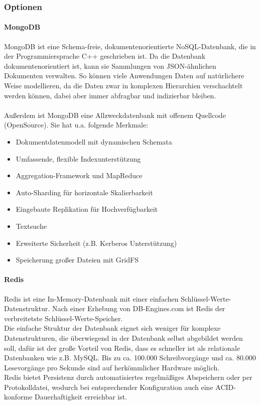 \documentclass[11pt]{article}
\begin{document}
\subsubsection{Optionen}

\paragraph{MongoDB}
MongoDB ist eine Schema-freie, dokumentenorientierte NoSQL-Datenbank, die in der Programmiersprache C++ geschrieben ist. Da die Datenbank dokumentenorientiert ist, kann sie Sammlungen von JSON-\"ahnlichen Dokumenten verwalten. So k\"onnen viele Anwendungen Daten auf nat\"urlichere Weise modellieren, da die Daten zwar in komplexen Hierarchien verschachtelt werden k\"onnen, dabei aber immer abfragbar und indizierbar bleiben.\\\\
Au{\ss}erdem ist MongoDB eine Allzweckdatenbank mit offenem Quellcode (OpenSource).
Sie hat u.a. folgende Merkmale:

\begin{itemize}
	\item Dokumentdatenmodell mit dynamischen Schemata
	\item Umfassende, flexible Indexunterst\"utzung
	\item Aggregation-Framework und MapReduce
	\item Auto-Sharding f\"ur horizontale Skalierbarkeit
	\item Eingebaute Replikation f\"ur Hochverf\"ugbarkeit
	\item Textsuche
	\item Erweiterte Sicherheit (z.B. Kerberos Unterst\"utzung)
	\item Speicherung gro{\ss}er Dateien mit GridFS
\end{itemize}

\paragraph{Redis}
Redis ist eine In-Memory-Datenbank mit einer einfachen Schl\"ussel-Werte-Datenstruktur. Nach einer Erhebung von DB-Engines.com ist Redis der verbreitetste Schl\"ussel-Werte-Speicher.\\
Die einfache Struktur der Datenbank eignet sich weniger f\"ur komplexe Datenstrukturen, die \"uberwiegend in der Datenbank selbst abgebildet werden soll, daf\"ur ist der gro{\ss}e Vorteil von Redis, dass es schneller ist als relationale Datenbanken wie z.B. MySQL. Bis zu ca. 100.000 Schreibvorg\"ange und ca. 80.000 Lesevorg\"ange pro Sekunde sind auf herk\"ommlicher Hardware m\"oglich.\\
Redis bietet Persistenz durch automatisiertes regelm\"a{\ss}iges Abspeichern oder per Protokolldatei, wodurch bei entsprechender Konfiguration auch eine ACID-konforme Dauerhaftigkeit erreichbar ist.
\end{document}
